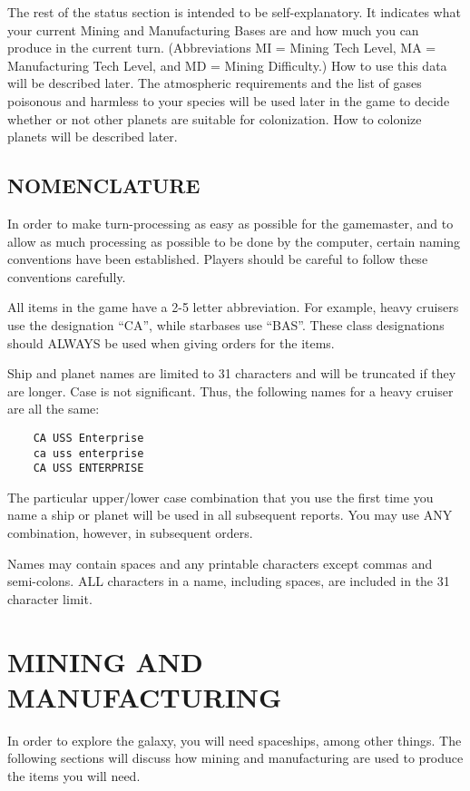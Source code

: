 \documentclass[10pt,titlepage]{article}
\begin{document}
The rest of the status section is intended to be self-explanatory.  It
indicates what your current Mining and Manufacturing Bases are and how much
you can produce in the current turn.  (Abbreviations MI = Mining Tech Level,
MA = Manufacturing Tech Level, and MD = Mining Difficulty.)  How to use this
data will be described later.  The atmospheric requirements and the list of
gases poisonous and harmless to your species will be used later in the game
to decide whether or not other planets are suitable for colonization.  How
to colonize planets will be described later.


\subsection{NOMENCLATURE}
\label{sec:nomenclature}


In order to make turn-processing as easy as possible for the gamemaster, and to
allow as much processing as possible to be done by the computer, certain naming
conventions have been established.  Players should be careful to follow these
conventions carefully.

All items in the game have a 2-5 letter abbreviation.  For example, heavy
cruisers use the designation ``CA'', while starbases use ``BAS''.  These class
designations should ALWAYS be used when giving orders for the items.

Ship and planet names are limited to 31 characters and will be truncated if
they are longer.  Case is not significant.  Thus, the following names for a
heavy cruiser are all the same:
\begin{verbatim}
	CA USS Enterprise
	ca uss enterprise
	CA USS ENTERPRISE
\end{verbatim}

The particular upper/lower case combination that you use the first time you
name a ship or planet will be used in all subsequent reports.  You may use
ANY combination, however, in subsequent orders.

Names may contain spaces and any printable characters except commas and
semi-colons.  ALL characters in a name, including spaces, are included in
the 31 character limit.



\section{MINING AND MANUFACTURING}
\label{sec:miningandmanufacturing}

In order to explore the galaxy, you will need spaceships, among other things.
The following sections will discuss how mining and manufacturing are used to
produce the items you will need.
\end{document}
